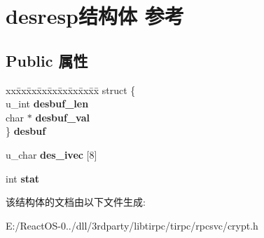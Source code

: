 \hypertarget{structdesresp}{}\section{desresp结构体 参考}
\label{structdesresp}
\subsection*{Public 属性}
\begin{DoxyCompactItemize}
\item 
\mbox{\label{structdesresp_a7ef697011ed46ccbce20eec105eb4113}} 
\begin{tabbing}
xx\=xx\=xx\=xx\=xx\=xx\=xx\=xx\=xx\=\kill
struct \{\\
\>u\_int {\bfseries desbuf\_len}\\
\>char $\ast$ {\bfseries desbuf\_val}\\
\} {\bfseries desbuf}\\

\end{tabbing}\item 
\mbox{\label{structdesresp_a8866bac604ca0666fdb7af6eca4e5f03}} 
u\+\_\+char {\bfseries des\+\_\+ivec} \mbox{[}8\mbox{]}
\item 
\mbox{\label{structdesresp_a1dd09f004de8f89317b71466091081f9}} 
int {\bfseries stat}
\end{DoxyCompactItemize}


该结构体的文档由以下文件生成\+:\begin{DoxyCompactItemize}
\item 
E\+:/\+React\+O\+S-\/0../dll/3rdparty/libtirpc/tirpc/rpcsvc/crypt.\+h\end{DoxyCompactItemize}
